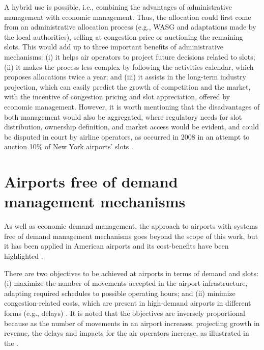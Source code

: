A hybrid use is possible, i.e., combining the advantages of administrative management with economic management. Thus, the allocation could first come from an administrative allocation process (e.g., \acrshort{WASG} and adaptations made by the local authorities), selling at congestion price or auctioning the remaining slots. This would add up to three important benefits of administrative mechanisms: (i) it helps air operators to project future decisions related to slots; (ii) it makes the process less complex by following the activities calendar, which proposes allocations twice a year; and (iii) it assists in the long-term industry projection, which can easily predict the growth of competition and the market, with the incentive of congestion pricing and slot appreciation, offered by economic management. However, it is worth mentioning that the disadvantages of both management would also be aggregated, where regulatory needs for slot distribution, ownership definition, and market access would be evident, and could be disputed in court by airline operators, as occurred in 2008 in an attempt to auction 10\% of New York airports’ slots \cite{cavusoglu2021minimum, gillen2016airport, BichlerAuction2022}.

\section{Airports free of demand management mechanisms}

As well as economic demand management, the approach to airports with systems free of demand management mechanisms goes beyond the scope of this work, but it has been applied in American airports and its cost-benefits have been highlighted \cite{cavusoglu2021minimum, gillen2016airport}.

There are two objectives to be achieved at airports in terms of demand and slots: (i) maximize the number of movements accepted in the airport infrastructure, adapting required schedules to possible operating hours; and (ii) minimize congestion-related costs, which are present in high-demand airports in different forms (e.g., delays) \cite{cavusoglu2021minimum}. It is noted that the objectives are inversely proportional because as the number of movements in an airport increases, projecting growth in revenue, the delays and impacts for the air operators increase, as illustrated in the  \cite{ zografos2017increasing, swaroop2012more, gillen2016airport}.


%

